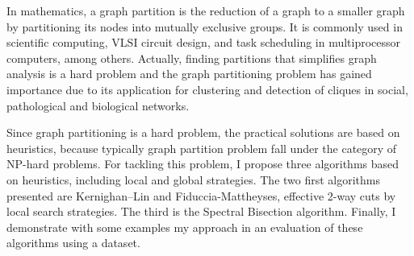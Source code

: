 In mathematics, a graph partition is the reduction of a graph to a smaller graph by partitioning its nodes into mutually exclusive groups. It is commonly used in scientific computing, VLSI circuit design, and task scheduling in multiprocessor computers, among others. Actually, finding partitions that simplifies graph analysis is a hard problem and the graph partitioning problem has gained importance due to its application for clustering and detection of cliques in social, pathological and biological networks. 

Since graph partitioning is a hard problem, the practical solutions are based on heuristics, because typically graph partition problem fall under the category of NP-hard problems. For tackling this problem, I propose three algorithms based on heuristics, including local and global strategies. The two first algorithms presented are Kernighan–Lin and Fiduccia-Mattheyses, effective 2-way cuts by local search strategies. The third is the Spectral Bisection algorithm. Finally, I demonstrate with some examples my approach in an evaluation of these algorithms using a dataset.


